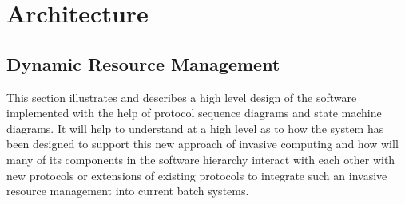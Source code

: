 \chapter{Architecture}
\label{chapter:dynamic resource}

\section{Dynamic Resource Management}

This section illustrates and describes a high level design of the software implemented with the help of protocol sequence diagrams and state machine diagrams. It will help to understand at a high level as to how the system has been designed to support this new approach of invasive computing and how will many of its components in the software hierarchy interact with each other with new protocols or extensions of existing protocols to integrate such an invasive resource management into current batch systems.\\

